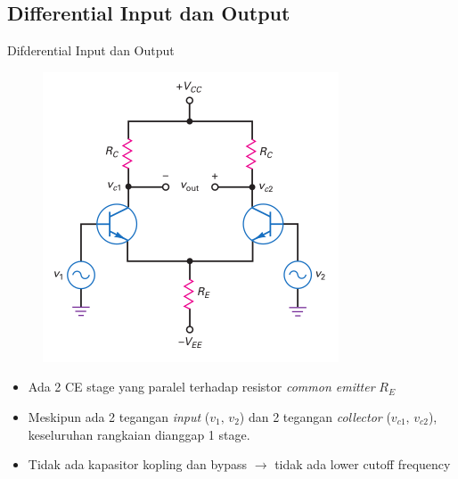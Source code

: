 \documentclass[aspectratio=169]{beamer}
\begin{document}
\subsection{Differential Input dan Output}
\begin{frame}{Difderential Input dan Output}
	\begin{multicols}{2}
		\begin{figure}
			\centering
			\includegraphics[height=0.7\textheight]{gambar/01.differential_input_output}
		\end{figure}
		\columnbreak
		\begin{itemize}
			\item Ada 2 CE stage yang paralel terhadap resistor \textit{common emitter} $ R_E $
			\item Meskipun ada 2 tegangan \textit{input} ($ v_1 \text{, } v_2$) dan 2 tegangan \textit{collector} ($ v_{c1} \text{, } v_{c2}$), keseluruhan rangkaian dianggap 1 stage.
			\item Tidak ada kapasitor kopling dan bypass $ \rightarrow $ tidak ada lower cutoff frequency
		\end{itemize}
	\end{multicols}
\end{frame}
\end{document}
